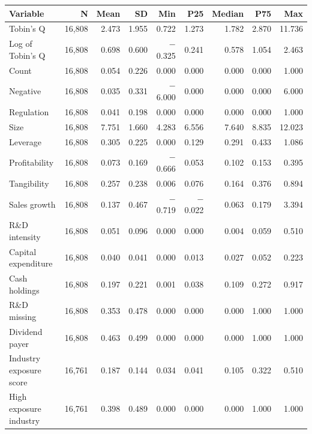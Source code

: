 \begin{tabular}{lrrrrrrrr}
\toprule
Variable & N & Mean & SD & Min & P25 & Median & P75 & Max \\
\midrule
Tobin's Q & 16,808 & 2.473 & 1.955 & 0.722 & 1.273 & 1.782 & 2.870 & 11.736 \\
Log of Tobin's Q & 16,808 & 0.698 & 0.600 & $-$0.325 & 0.241 & 0.578 & 1.054 & 2.463 \\
Count & 16,808 & 0.054 & 0.226 & 0.000 & 0.000 & 0.000 & 0.000 & 1.000 \\
Negative & 16,808 & 0.035 & 0.331 & $-$6.000 & 0.000 & 0.000 & 0.000 & 6.000 \\
Regulation & 16,808 & 0.041 & 0.198 & 0.000 & 0.000 & 0.000 & 0.000 & 1.000 \\
Size & 16,808 & 7.751 & 1.660 & 4.283 & 6.556 & 7.640 & 8.835 & 12.023 \\
Leverage & 16,808 & 0.305 & 0.225 & 0.000 & 0.129 & 0.291 & 0.433 & 1.086 \\
Profitability & 16,808 & 0.073 & 0.169 & $-$0.666 & 0.053 & 0.102 & 0.153 & 0.395 \\
Tangibility & 16,808 & 0.257 & 0.238 & 0.006 & 0.076 & 0.164 & 0.376 & 0.894 \\
Sales growth & 16,808 & 0.137 & 0.467 & $-$0.719 & $-$0.022 & 0.063 & 0.179 & 3.394 \\
R\&D intensity & 16,808 & 0.051 & 0.096 & 0.000 & 0.000 & 0.004 & 0.059 & 0.510 \\
Capital expenditure & 16,808 & 0.040 & 0.041 & 0.000 & 0.013 & 0.027 & 0.052 & 0.223 \\
Cash holdings & 16,808 & 0.197 & 0.221 & 0.001 & 0.038 & 0.109 & 0.272 & 0.917 \\
R\&D missing & 16,808 & 0.353 & 0.478 & 0.000 & 0.000 & 0.000 & 1.000 & 1.000 \\
Dividend payer & 16,808 & 0.463 & 0.499 & 0.000 & 0.000 & 0.000 & 1.000 & 1.000 \\
Industry exposure score & 16,761 & 0.187 & 0.144 & 0.034 & 0.041 & 0.105 & 0.322 & 0.510 \\
High exposure industry & 16,761 & 0.398 & 0.489 & 0.000 & 0.000 & 0.000 & 1.000 & 1.000 \\
\bottomrule
\end{tabular}
